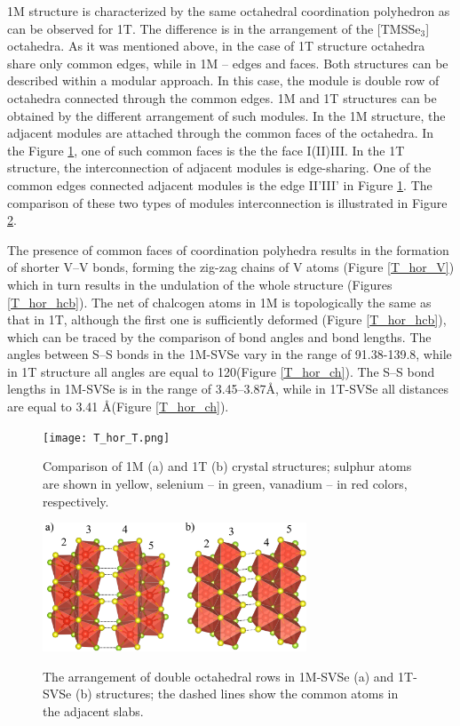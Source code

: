 \documentclass[a4paperm]{article}
\begin{document}
1M structure is characterized by the same octahedral coordination polyhedron as can be observed for 1T.
The difference is in the arrangement of the [TMSSe$_3$] octahedra.
As it was mentioned above, in the case of 1T structure octahedra share only common edges, while in 1M -- edges and faces.
Both structures can be described within a modular approach.
In this case, the module is double row of octahedra connected through the common edges.
1M and 1T structures can be obtained by the different arrangement of such modules.
In the 1M structure, the adjacent modules are attached through the common faces of the octahedra.
In the Figure \ref{T_hor_T}, one of such common faces is the the face I(II)III.
In the 1T structure, the interconnection of adjacent modules is edge-sharing.
One of the common edges connected adjacent modules is the edge II'III' in Figure \ref{T_hor_T}. 
The comparison of these two types of modules interconnection is illustrated in Figure \ref{T_hor_slabs}.


The presence of common faces of coordination polyhedra results in the formation of shorter V--V bonds, forming the zig-zag chains of V atoms (Figure \ref{T_hor_V}) which in turn results in the undulation of the whole structure (Figures \ref{T_hor_hcb}).
The net of chalcogen atoms in 1M is topologically the same as that in 1T, although the first one is sufficiently deformed (Figure \ref{T_hor_hcb}), which can be traced by the comparison of bond angles and bond lengths.
The angles between S--S bonds in the 1M-SVSe vary in the range of 91.38-139.8\textdegree, while in 1T structure all angles are equal to 120\textdegree (Figure \ref{T_hor_ch}).
The S--S bond lengths in 1M-SVSe is in the range of 3.45--3.87\AA, while in 1T-SVSe all distances are equal to 3.41 \AA (Figure \ref{T_hor_ch}).


\begin{figure}[H]
	\texttt{[image: T\_hor\_T.png]} \\
	\caption{Comparison of 1M (a) and 1T (b) crystal structures; sulphur atoms are shown in yellow, selenium -- in green, vanadium -- in red colors, respectively.}
	\label{T_hor_T}
\end{figure}

\begin{figure}[H]
	\includegraphics[width=0.7\textwidth]{T_hor_slabs.png} \\
	\caption{The arrangement of double octahedral rows in 1M-SVSe (a) and 1T-SVSe (b) structures; the dashed lines show the common atoms in the adjacent slabs.}
	\label{T_hor_slabs}
\end{figure}
\end{document}
